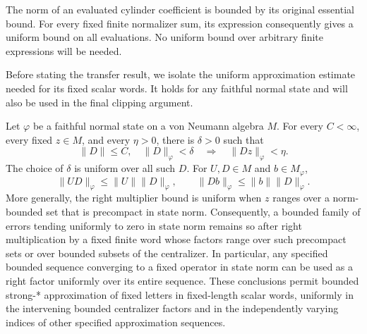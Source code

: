 The norm of an evaluated cylinder coefficient is bounded by its
original essential bound. For every fixed finite normalizer sum,
its expression consequently gives a uniform bound on all evaluations.
No uniform bound over arbitrary finite expressions will be needed.

Before stating the transfer result, we isolate the uniform approximation
estimate needed for its fixed scalar words. It holds for any faithful normal
state and will also be used in the final clipping argument.

\begin{lemma}\label{lem:state-multipliers}
Let $\varphi$ be a faithful normal state on a von Neumann algebra $M$.
For every $C<\infty$, every fixed $z\in M$, and every $\eta>0$, there
is $\delta>0$ such that
\begin{equation}\label{eq:uniform-fixed-right}
 \|D\|\leq C,\quad\|D\|_\varphi<\delta
 \quad\Longrightarrow\quad \|Dz\|_\varphi<\eta.
\end{equation}
The choice of $\delta$ is uniform over all such $D$.
For $U,D\in M$ and $b\in M_\varphi$,
\begin{equation}\label{eq:state-left-centralizer}
 \|UD\|_\varphi\leq\|U\|\|D\|_\varphi,
 \qquad
 \|Db\|_\varphi\leq\|b\|\|D\|_\varphi.
\end{equation}
More generally, the right multiplier bound is uniform when $z$ ranges
over a norm-bounded set that is precompact in state norm.
Consequently, a bounded family of errors tending uniformly to zero in
state norm remains so after right multiplication by a fixed finite word
whose factors range over such precompact sets or over bounded subsets
of the centralizer.  In particular, any specified bounded sequence
converging to a fixed operator in state norm can be used as a right
factor uniformly over its entire sequence.  These conclusions permit
bounded strong-* approximation of fixed letters in fixed-length scalar
words, uniformly in the intervening bounded centralizer factors and in
the independently varying indices of other specified approximation
sequences.
\end{lemma}

